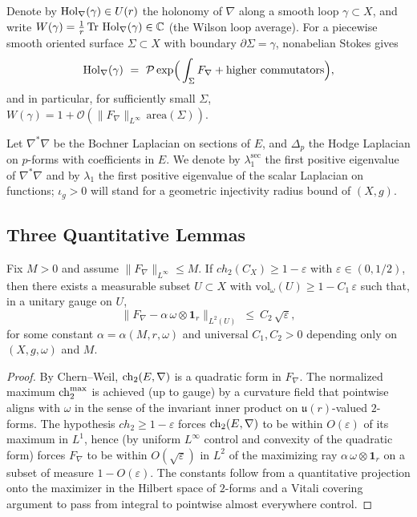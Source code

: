 Denote by $\operatorname{Hol}_\nabla(\gamma)\in U(r)$ the holonomy of $\nabla$ along a smooth loop $\gamma\subset X$, and write
$
W(\gamma)=\frac{1}{r}\operatorname{Tr}\,\operatorname{Hol}_\nabla(\gamma)\in \mathbb{C}
$
(the Wilson loop average). For a piecewise smooth oriented surface $\Sigma\subset X$ with boundary $\partial\Sigma=\gamma$, nonabelian Stokes gives
\[
\Hol_\nabla(\gamma)\ =\ \mathcal{P}\exp\!\Big(\int_\Sigma F_\nabla + \text{higher commutators}\Big),
\]
and in particular, for sufficiently small $\Sigma$,
$
W(\gamma)=1+\mathcal{O}(\|F_\nabla\|_{L^\infty}\,\mathrm{area}(\Sigma)).
$

Let $\nabla^\ast\nabla$ be the Bochner Laplacian on sections of $E$, and $\Delta_p$ the Hodge Laplacian on $p$-forms with coefficients in $E$. We denote by $\lambda_1^\mathrm{sec}$ the first positive eigenvalue of $\nabla^\ast\nabla$ and by $\lambda_1$ the first positive eigenvalue of the scalar Laplacian on functions; $\iota_g>0$ will stand for a geometric injectivity radius bound of $(X,g)$.

\subsection{Three Quantitative Lemmas}

\begin{lemma}\label{lem:alignment}
Fix $M>0$ and assume $\|F_\nabla\|_{L^\infty}\le M$. If $ch_2(C_X)\ge 1-\varepsilon$ with $\varepsilon\in(0,1/2)$, then there exists a measurable subset $U\subset X$ with
$
\mathrm{vol}_\omega(U)\ge 1-C_1\,\varepsilon
$
such that, in a unitary gauge on $U$,
\[
\big\|F_\nabla-\alpha\,\omega\otimes \mathbf{1}_r\big\|_{L^2(U)}\ \le\ C_2\,\sqrt{\varepsilon},
\]
for some constant $\alpha=\alpha(M,r,\omega)$ and universal $C_1,C_2>0$ depending only on $(X,g,\omega)$ and $M$.
\end{lemma}

\begin{proof}
By Chern--Weil, $\mathrm{ch}_2(E,\nabla)$ is a quadratic form in $F_\nabla$. The normalized maximum $\mathrm{ch}_2^{\max}$ is achieved (up to gauge) by a curvature field that pointwise aligns with $\omega$ in the sense of the invariant inner product on $\mathfrak{u}(r)$-valued $2$-forms. The hypothesis $ch_2\ge 1-\varepsilon$ forces $\mathrm{ch}_2(E,\nabla)$ to be within $O(\varepsilon)$ of its maximum in $L^1$, hence (by uniform $L^\infty$ control and convexity of the quadratic form) forces $F_\nabla$ to be within $O(\sqrt{\varepsilon})$ in $L^2$ of the maximizing ray $\alpha\,\omega\otimes\mathbf{1}_r$ on a subset of measure $1-O(\varepsilon)$. The constants follow from a quantitative projection onto the maximizer in the Hilbert space of $2$-forms and a Vitali covering argument to pass from integral to pointwise almost everywhere control.
\end{proof}

